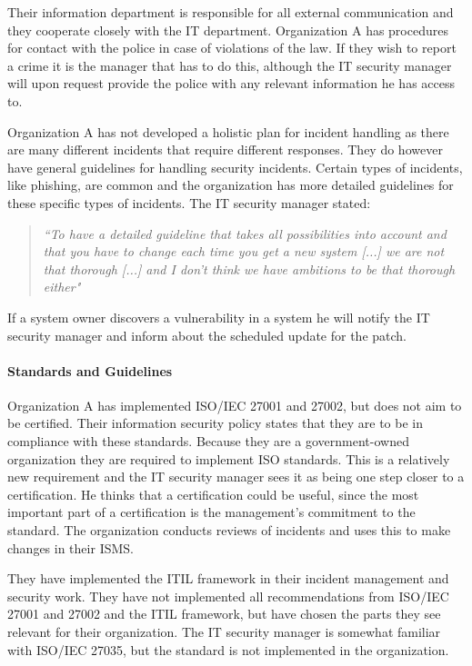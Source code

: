 Their information department is responsible for all external communication and they cooperate closely with the IT department. Organization A has procedures for contact with the police in case of violations of the law. If they wish to report a crime it is the manager that has to do this, although the IT security manager will upon request provide the police with any relevant information he has access to. 

Organization A has not developed a holistic plan for incident handling as there are many different incidents that require different responses. They do however have general guidelines for handling security incidents. Certain types of incidents, like phishing, are common and the organization has more detailed guidelines for these specific types of incidents. The IT security manager stated:

\begin{quote}
\textit{``To have a detailed guideline that takes all possibilities into account and that you have to change each time you get a new system %
[...] we are not that thorough [...] and I don't think we have ambitions to be that thorough either"}
\end{quote}

If a system owner discovers a vulnerability in a system he will notify the IT security manager and inform about the scheduled update for the patch. 

\paragraph{Standards and Guidelines}
Organization A has implemented \acs{ISO}/\acs{IEC} 27001 and 27002, but does not aim to be certified. Their information security policy states that they are to be in compliance with these standards. Because they are a government-owned organization they are required to implement \acs{ISO} standards. This is a relatively new requirement and the IT security manager sees it as being one step closer to a certification. He thinks that a certification could be useful, since the most important part of a certification is the management's commitment to the standard. The organization conducts reviews of incidents and uses this to make changes in their \ac{ISMS}. 

They have implemented the \ac{ITIL} framework in their incident management and security work. They have not implemented all recommendations from \acs{ISO}/\acs{IEC} 27001 and 27002 and the \ac{ITIL} framework, but have chosen the parts they see relevant for their organization. The IT security manager is somewhat familiar with \acs{ISO}/\acs{IEC} 27035, but the standard is not implemented in the organization.

